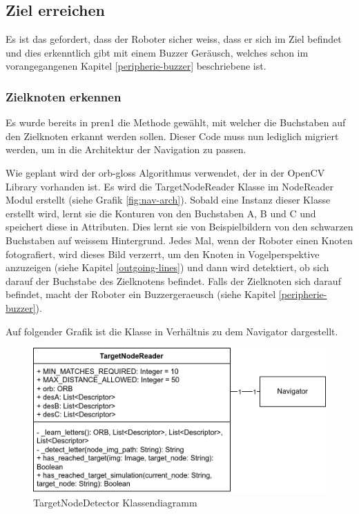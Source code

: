 \subsection{Ziel erreichen}

Es ist das gefordert, dass der Roboter sicher weiss, dass er sich im Ziel befindet und dies erkenntlich gibt mit einem Buzzer Geräusch, welches schon im vorangegangenen Kapitel \ref{peripherie-buzzer} beschriebene ist.

\subsubsection{Zielknoten erkennen}
\label{detect-target}

Es wurde bereits in \acrshort{pren1} die Methode gewählt, mit welcher die Buchstaben auf den Zielknoten erkannt werden sollen. Dieser Code muss nun lediglich migriert werden, um in die Architektur der Navigation zu passen.

Wie geplant wird der \gls{orb-gloss} Algorithmus verwendet, der in der OpenCV Library vorhanden ist. Es wird die TargetNodeReader Klasse im NodeReader Modul erstellt (siehe Grafik \ref{fig:nav-arch}). Sobald eine Instanz dieser Klasse erstellt wird, lernt sie die Konturen von den Buchstaben A, B und C und speichert diese in Attributen.
Dies lernt sie von Beispielbildern von den schwarzen Buchstaben auf weissem Hintergrund.
Jedes Mal, wenn der Roboter einen Knoten fotografiert, wird dieses Bild verzerrt, um den Knoten in Vogelperspektive anzuzeigen (siehe Kapitel \ref{outgoing-lines}) und dann wird detektiert, ob sich darauf der Buchstabe des Zielknotens befindet. Falls der Zielknoten sich darauf befindet, macht der Roboter ein Buzzergeraeusch (siehe Kapitel \ref{peripherie-buzzer}).

Auf folgender Grafik ist die Klasse in Verhältnis zu dem Navigator dargestellt.

\begin{figure}[H]
\centering
\includegraphics[width=\textwidth]{assets/IT/robot-sw-architecture-target-node-detector.png}
\caption{TargetNodeDetector Klassendiagramm}
\label{fig:target-node-nav}
\end{figure}

